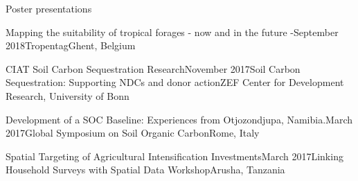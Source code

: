 \documentclass{resume} %
\begin{document}
\begin{rSection}{Poster presentations}

\begin{sSubsection}{Mapping the suitability of tropical forages - now and in the future -}{}{September 2018}{Tropentag}{Ghent, Belgium}
\end{sSubsection}

\begin{sSubsection}{CIAT Soil Carbon Sequestration Research}{}{November 2017}{Soil Carbon Sequestration: Supporting NDCs and donor action}{ZEF Center for Development Research, University of Bonn}
\end{sSubsection}

\begin{sSubsection}{Development of a SOC Baseline: Experiences from Otjozondjupa, Namibia.}{}{March 2017}{Global Symposium on Soil Organic Carbon}{Rome, Italy}
\end{sSubsection}

\begin{sSubsection}{Spatial Targeting of Agricultural Intensification Investments}{}{March 2017}{Linking Household Surveys with Spatial Data Workshop}{Arusha, Tanzania}
\end{sSubsection}
\end{rSection}


\end{document}
